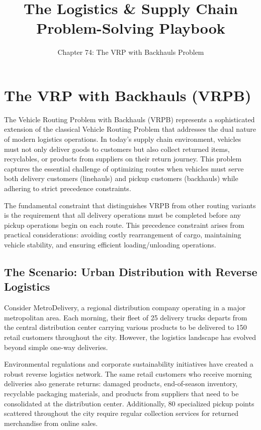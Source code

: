 \documentclass{article}
\title{\textbf{The Logistics \& Supply Chain Problem-Solving Playbook}}
\author{Chapter 74: The VRP with Backhauls Problem}
\date{}
\begin{document}
\maketitle

\section{The VRP with Backhauls (VRPB)}

The Vehicle Routing Problem with Backhauls (VRPB) represents a sophisticated extension of the classical Vehicle Routing Problem that addresses the dual nature of modern logistics operations. In today's supply chain environment, vehicles must not only deliver goods to customers but also collect returned items, recyclables, or products from suppliers on their return journey. This problem captures the essential challenge of optimizing routes when vehicles must serve both delivery customers (linehauls) and pickup customers (backhauls) while adhering to strict precedence constraints.

The fundamental constraint that distinguishes VRPB from other routing variants is the requirement that all delivery operations must be completed before any pickup operations begin on each route. This precedence constraint arises from practical considerations: avoiding costly rearrangement of cargo, maintaining vehicle stability, and ensuring efficient loading/unloading operations.

\subsection{The Scenario: Urban Distribution with Reverse Logistics}

Consider MetroDelivery, a regional distribution company operating in a major metropolitan area. Each morning, their fleet of 25 delivery trucks departs from the central distribution center carrying various products to be delivered to 150 retail customers throughout the city. However, the logistics landscape has evolved beyond simple one-way deliveries.

Environmental regulations and corporate sustainability initiatives have created a robust reverse logistics network. The same retail customers who receive morning deliveries also generate returns: damaged products, end-of-season inventory, recyclable packaging materials, and products from suppliers that need to be consolidated at the distribution center. Additionally, 80 specialized pickup points scattered throughout the city require regular collection services for returned merchandise from online sales.
\end{document}
